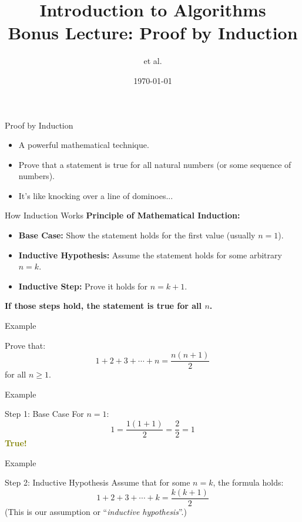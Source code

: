 \documentclass{beamer}
\title[Induction]{Introduction to Algorithms \\ Bonus Lecture: Proof by Induction}
\author{et al.}
\date{\today}
\begin{document}
\frame{\titlepage}

\begin{frame}{Proof by Induction}
    \begin{itemize}
        \item A powerful mathematical technique.
        \item Prove that a statement is true for all natural numbers (or some sequence of numbers). \item It's like knocking over a line of dominoes...
    \end{itemize}
\end{frame}

\begin{frame}{How Induction Works}
    \textbf{Principle of Mathematical Induction:}
    \begin{itemize}
        \item \textbf{Base Case:} Show the statement holds for the first value (usually $n = 1$).
        \item \textbf{Inductive Hypothesis:} Assume the statement holds for some arbitrary $n = k$.
        \item \textbf{Inductive Step:} Prove it holds for $n = k+1$.
    \end{itemize}
    \pause
    \textbf{If those steps hold, the statement is true for all $n$.}
\end{frame}

\begin{frame}{Example}
    \begin{exampleblock}{ }
        Prove that:
        $$
            1 + 2 + 3 + \cdots + n = \frac{n(n + 1)}{2}
        $$
        for all $n \geq 1$.
    \end{exampleblock}
\end{frame}

\begin{frame}{Example}
    \begin{exampleblock}{Step 1: Base Case}
        For $n = 1$:
        $$
            1 = \frac{1(1 + 1)}{2} = \frac{2}{2} = 1
        $$ \checkmark
        \textcolor{olive}{\textbf{True!}}
    \end{exampleblock}
\end{frame}

\begin{frame}{Example}
    \begin{exampleblock}{Step 2: Inductive Hypothesis}
        Assume that for some $n = k$, the formula holds:
        $$
            1 + 2 + 3 + \cdots + k = \frac{k(k + 1)}{2}
        $$
        (This is our assumption or ``\textit{inductive hypothesis}''.)
    \end{exampleblock}
\end{frame}
\end{document}
